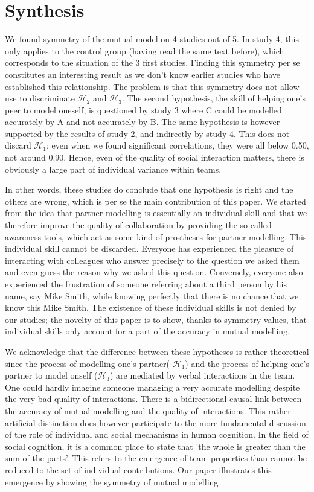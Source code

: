 \documentclass[natbib]{svjour3}
\begin{document}
\section{Synthesis}

We found symmetry of the mutual model on 4 studies out of 5. In study 4, this
only applies to the control group (having read the same text before), which
corresponds to the situation of the 3 first studies.  Finding this symmetry per
se constitutes an interesting result as we don't know earlier studies who have
established this relationship. The problem is that this symmetry does not allow
use to discriminate  $\mathcal{H}_{2}$ and $\mathcal{H}_{3}$. The second
hypothesis, the skill of helping one's peer to model oneself, is questioned by
study 3 where C could be modelled  accurately by A and not accurately by B. The
same hypothesis is however supported by the results of study 2, and indirectly
by study 4.  This does not discard $\mathcal{H}_{1}$: even when we found
significant correlations, they were all below 0.50, not around 0.90.  Hence,
even of the quality of social interaction matters, there is obviously a large
part of individual variance within teams.

In other words, these studies do conclude that one hypothesis is right and the
others are wrong, which is per se the main contribution of this paper. We
started from the idea that partner modelling is essentially an individual skill
and that we therefore improve the quality of collaboration by providing the
so-called awareness tools, which act as some kind of prostheses for partner
modelling. This individual skill cannot be discarded.  Everyone has experienced
the pleasure of interacting with colleagues who answer precisely to the question
we asked them  and even guess the reason why we asked this question. Conversely,
everyone also experienced the frustration of someone referring about a third
person by his name, say Mike Smith,  while knowing perfectly that there is no
chance that we know this Mike Smith. The existence of these individual skills is
not denied by our studies; the novelty of this paper is to show, thanks to
symmetry values, that individual skills only account  for a part of the accuracy
in mutual modelling. 


We acknowledge that the difference between these hypotheses is  rather
theoretical since the  process of modelling one's partner( $\mathcal{H}_{1}$)
and the process of helping one's partner to model onself ($\mathcal{H}_{3}$) are
mediated by verbal interactions in the team. One could hardly imagine someone
managing a very accurate modelling despite the very bad quality of interactions.
There is a bidirectional causal link between the accuracy of mutual modelling
and the quality of interactions. This rather artificial distinction does however
participate to the more fundamental discussion of the role of individual and
social mechanisms in human cognition. In the field of social cognition, it is a
common place to state that 'the whole is greater than the sum of the parts'.
This refers to the emergence of team properties than cannot be reduced to the
set of individual contributions.  Our paper illustrates this emergence by
showing the symmetry of mutual modelling
\end{document}
